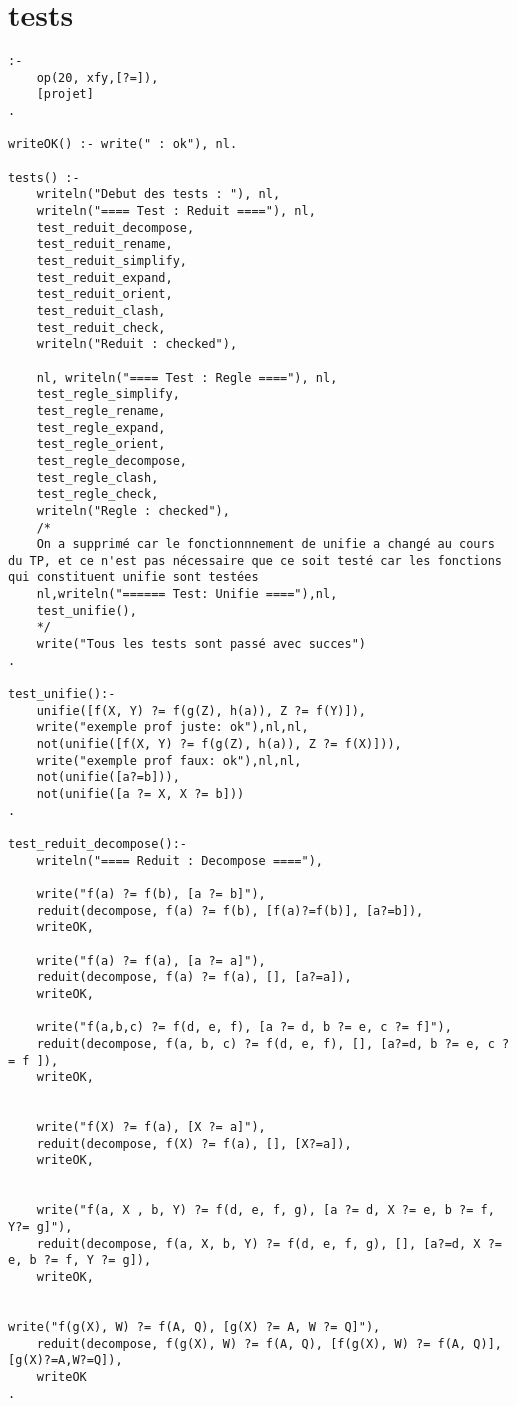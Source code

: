 \documentclass[10pt,a4paper]{report}
\begin{document}
\section{tests}
\begin{lstlisting}[caption ={le fichier test.pl}]
:-
	op(20, xfy,[?=]),
	[projet]
.

writeOK() :- write(" : ok"), nl.

tests() :-
	writeln("Debut des tests : "), nl,
	writeln("==== Test : Reduit ===="), nl,
	test_reduit_decompose,
	test_reduit_rename,
	test_reduit_simplify,
	test_reduit_expand,
	test_reduit_orient,
	test_reduit_clash,
	test_reduit_check,
	writeln("Reduit : checked"),

	nl, writeln("==== Test : Regle ===="), nl,
	test_regle_simplify,
	test_regle_rename,
	test_regle_expand,
	test_regle_orient,
	test_regle_decompose,
	test_regle_clash,
	test_regle_check,
	writeln("Regle : checked"),
	/*
	On a supprimé car le fonctionnnement de unifie a changé au cours du TP, et ce n'est pas nécessaire que ce soit testé car les fonctions qui constituent unifie sont testées
	nl,writeln("====== Test: Unifie ===="),nl,
	test_unifie(),
	*/
	write("Tous les tests sont passé avec succes")
.

test_unifie():-
	unifie([f(X, Y) ?= f(g(Z), h(a)), Z ?= f(Y)]),
	write("exemple prof juste: ok"),nl,nl,
	not(unifie([f(X, Y) ?= f(g(Z), h(a)), Z ?= f(X)])),
	write("exemple prof faux: ok"),nl,nl,
	not(unifie([a?=b])),
	not(unifie([a ?= X, X ?= b]))
.

test_reduit_decompose():-
	writeln("==== Reduit : Decompose ===="),

	write("f(a) ?= f(b), [a ?= b]"),
	reduit(decompose, f(a) ?= f(b), [f(a)?=f(b)], [a?=b]),
	writeOK,
	
	write("f(a) ?= f(a), [a ?= a]"), 
	reduit(decompose, f(a) ?= f(a), [], [a?=a]),
	writeOK,

	write("f(a,b,c) ?= f(d, e, f), [a ?= d, b ?= e, c ?= f]"), 
	reduit(decompose, f(a, b, c) ?= f(d, e, f), [], [a?=d, b ?= e, c ?= f ]),
	writeOK,


	write("f(X) ?= f(a), [X ?= a]"), 
	reduit(decompose, f(X) ?= f(a), [], [X?=a]),
	writeOK,


	write("f(a, X , b, Y) ?= f(d, e, f, g), [a ?= d, X ?= e, b ?= f, Y?= g]"), 
	reduit(decompose, f(a, X, b, Y) ?= f(d, e, f, g), [], [a?=d, X ?= e, b ?= f, Y ?= g]),
	writeOK,


write("f(g(X), W) ?= f(A, Q), [g(X) ?= A, W ?= Q]"),
	reduit(decompose, f(g(X), W) ?= f(A, Q), [f(g(X), W) ?= f(A, Q)], [g(X)?=A,W?=Q]),
	writeOK
.


\end{lstlisting}
\end{document}
